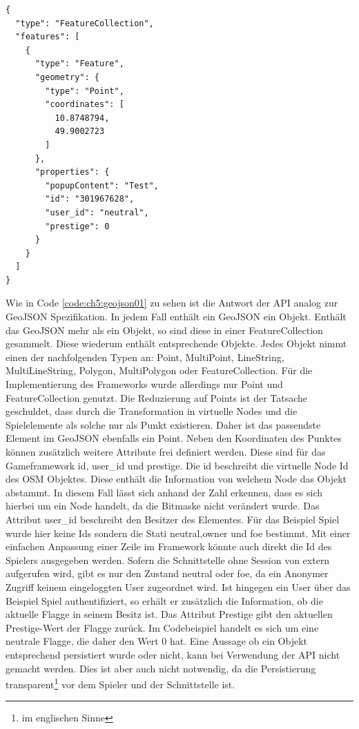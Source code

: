 \begin{lstlisting}[caption=GeoJSON Response Location (Reduziert), label=code:ch5:geojson01]
{
  "type": "FeatureCollection",
  "features": [
    {
      "type": "Feature",
      "geometry": {
        "type": "Point",
        "coordinates": [
          10.8748794,
          49.9002723
        ]
      },
      "properties": {
        "popupContent": "Test",
        "id": "301967628",
        "user_id": "neutral",
        "prestige": 0
      }
    }
  ]
}
\end{lstlisting}

Wie in Code \ref{code:ch5:geojson01} zu sehen ist die Antwort der API analog zur GeoJSON Spezifikation.\cite{Butler.2008}
In jedem Fall enthält ein GeoJSON ein Objekt. Enthält das GeoJSON mehr als ein Objekt, so sind diese in einer FeatureCollection gesammelt. Diese wiederum enthält entsprechende Objekte.
Jedes Objekt nimmt einen der nachfolgenden Typen an:
 \glqq Point\grqq{}, \glqq MultiPoint\grqq{}, \glqq LineString\grqq{}, \glqq MultiLineString\grqq{}, \glqq Polygon\grqq{}, \glqq MultiPolygon\grqq{} oder \glqq FeatureCollection\grqq{}.
Für die Implementierung des Frameworks wurde allerdings nur Point und FeatureCollection genutzt. Die Reduzierung auf Points ist der Tatsache geschuldet, dass durch die Transformation in virtuelle Nodes und die Spielelemente als solche nur als Punkt existieren. Daher ist das passendste Element im GeoJSON ebenfalls ein Point. Neben den Koordinaten des Punktes können zusätzlich weitere Attribute frei definiert werden. Diese sind für das Gameframework id, user\_id und prestige. Die id beschreibt die virtuelle Node Id des OSM Objektes. Diese enthält die Information von welchem Node das Objekt abstammt. In diesem Fall lässt sich anhand der Zahl erkennen, dass es sich hierbei um ein Node handelt, da die Bitmaske nicht verändert wurde. Das Attribut user\_id beschreibt den Besitzer des Elementes. Für das Beispiel Spiel wurde hier keine Ids sondern die Stati \glqq neutral\grqq{},\glqq owner\grqq{} und \glqq foe\grqq{} bestimmt. Mit einer einfachen Anpassung einer Zeile im Framework könnte auch direkt die Id des Spielers ausgegeben werden. Sofern die Schnittstelle ohne Session von extern aufgerufen wird, gibt es nur den Zustand \glqq neutral\grqq{} oder \glqq foe\grqq{}, da ein Anonymer Zugriff keinem eingeloggten User zugeordnet wird. Ist hingegen ein User über das Beispiel Spiel authentifiziert, so erhält er zusätzlich die Information, ob die aktuelle Flagge in seinem Besitz ist.
Das Attribut Prestige gibt den aktuellen Prestige-Wert der Flagge zurück. Im Codebeispiel handelt es sich um eine neutrale Flagge, die daher den Wert 0 hat. Eine Aussage ob ein Objekt entsprechend persistiert wurde oder nicht, kann bei Verwendung der API nicht gemacht werden. Dies ist aber auch nicht notwendig, da 
die Persistierung transparent\footnote{im englischen Sinne} vor dem Spieler und der Schnittstelle ist.

